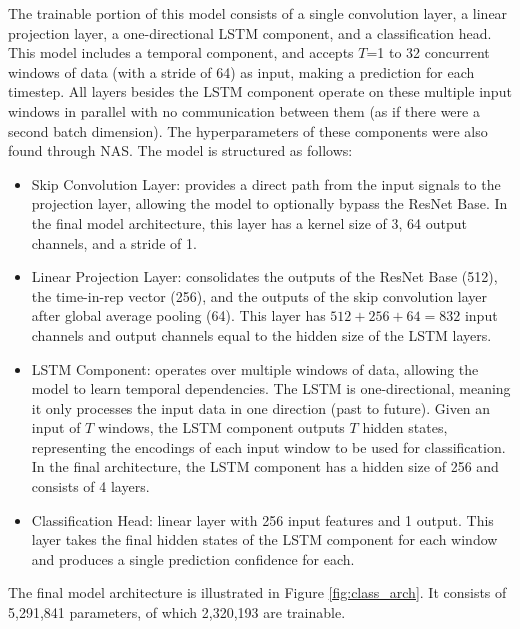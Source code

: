 \documentclass[conference]{IEEEtran}
\begin{document}
The trainable portion of this model consists of a single convolution layer, a linear projection layer, a one-directional LSTM component, and a classification head. This model includes a temporal component, and accepts $T$=1 to 32 concurrent windows of data (with a stride of 64) as input, making a prediction for each timestep. All layers besides the LSTM component operate on these multiple input windows in parallel with no communication between them (as if there were a second batch dimension). The hyperparameters of these components were also found through NAS. The model is structured as follows:
\begin{itemize} 
    \item Skip Convolution Layer: provides a direct path from the input signals to the projection layer, allowing the model to optionally bypass the ResNet Base. In the final model architecture, this layer has a kernel size of 3, 64 output channels, and a stride of 1.
    \item Linear Projection Layer: consolidates the outputs of the ResNet Base (512), the time-in-rep vector (256), and the outputs of the skip convolution layer after global average pooling (64). This layer has $512+256+64=832$ input channels and output channels equal to the hidden size of the LSTM layers.
    \item LSTM Component: operates over multiple windows of data, allowing the model to learn temporal dependencies. The LSTM is one-directional, meaning it only processes the input data in one direction (past to future). Given an input of $T$ windows, the LSTM component outputs $T$ hidden states, representing the encodings of each input window to be used for classification. In the final architecture, the LSTM component has a hidden size of 256 and consists of 4 layers.
    \item Classification Head: linear layer with 256 input features and 1 output. This layer takes the final hidden states of the LSTM component for each window and produces a single prediction confidence for each.
\end{itemize}

The final model architecture is illustrated in Figure \ref{fig:class_arch}. It consists of 5,291,841 parameters, of which 2,320,193 are trainable.
\end{document}
